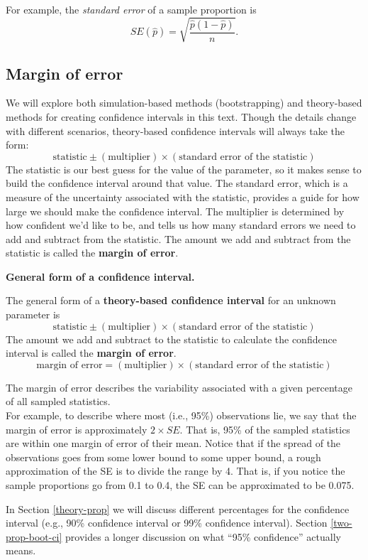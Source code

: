 \documentclass[
  10pt,
  openany]{book}
\theoremstyle{definition}
\theoremstyle{definition}
\theoremstyle{definition}
\theoremstyle{definition}
\theoremstyle{remark}
\begin{document}
For example, the \emph{standard error} of a sample proportion is
\[
SE(\hat{p}) = \sqrt{\frac{\hat{p}(1-\hat{p})}{n}}.
\]

\subsection{Margin of error}\label{moe}

We will explore both simulation-based methods (bootstrapping) and theory-based methods for creating confidence intervals in this text. Though the details change with different scenarios, theory-based confidence intervals will always take the form:
\[
\mbox{statistic} \pm (\mbox{multiplier}) \times (\mbox{standard error of the statistic})
\]
The statistic is our best guess for the value of the parameter, so it makes sense to build the confidence interval around that value. The standard error, which is a measure of the uncertainty associated with the statistic, provides a guide for how large we should make the confidence interval. The multiplier is determined by how confident we'd like to be, and tells us how many standard errors we need to add and subtract from the statistic. The amount we add and subtract from the statistic is called the \textbf{margin of error}.

\textbf{General form of a confidence interval.}

The general form of a \textbf{theory-based confidence interval} for an unknown parameter is
\[
\mbox{statistic} \pm (\mbox{multiplier}) \times (\mbox{standard error of the statistic})
\]
The amount we add and subtract to the statistic to calculate the confidence interval is called the \textbf{margin of error}.
\[
\mbox{margin of error} = (\mbox{multiplier}) \times (\mbox{standard error of the statistic})
\]

The margin of error describes the variability associated with a given percentage of all sampled statistics.\\
For example, to describe where most (i.e., 95\%) observations lie, we say that the margin of error is approximately \(2 \times SE\).
That is, 95\% of the sampled statistics are within one margin of error of their mean.
Notice that if the spread of the observations goes from some lower bound to some upper bound, a rough approximation of the SE is to divide the range by 4.
That is, if you notice the sample proportions go from 0.1 to 0.4, the SE can be approximated to be 0.075.

In Section \ref{theory-prop} we will discuss different percentages for the confidence interval (e.g., 90\% confidence interval or 99\% confidence interval). Section \ref{two-prop-boot-ci} provides a longer discussion on what ``95\% confidence'' actually means.
\end{document}
